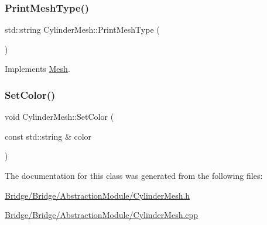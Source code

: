 \mbox{\label{class_cylinder_mesh_aa5edae04a31b3ccab1e051eba25781a7}} 
\subsubsection{\texorpdfstring{PrintMeshType()}{PrintMeshType()}}
{\footnotesize\ttfamily std\+::string Cylinder\+Mesh\+::\+Print\+Mesh\+Type (\begin{DoxyParamCaption}{ }\end{DoxyParamCaption})\hspace{0.3cm}{\ttfamily [virtual]}}



Implements \mbox{\hyperlink{class_mesh_a0d34fc4317a5e3bc2437b610141b9109}{Mesh}}.

\mbox{\label{class_cylinder_mesh_a892088bc6375fbee9a80b2022b05ea03}} 
\subsubsection{\texorpdfstring{SetColor()}{SetColor()}}
{\footnotesize\ttfamily void Cylinder\+Mesh\+::\+Set\+Color (\begin{DoxyParamCaption}\item[{const std\+::string \&}]{color }\end{DoxyParamCaption})}



The documentation for this class was generated from the following files\+:\begin{DoxyCompactItemize}
\item 
\mbox{\hyperlink{_bridge_2_bridge_2_abstraction_module_2_cylinder_mesh_8h}{Bridge/\+Bridge/\+Abstraction\+Module/\+Cylinder\+Mesh.\+h}}\item 
\mbox{\hyperlink{_bridge_2_bridge_2_abstraction_module_2_cylinder_mesh_8cpp}{Bridge/\+Bridge/\+Abstraction\+Module/\+Cylinder\+Mesh.\+cpp}}\end{DoxyCompactItemize}
